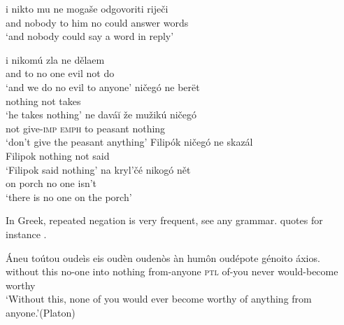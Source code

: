 \ea  \label{ex:07-serbian-answer}
\gll i nikto mu ne mogaše odgovoriti riječi \\
and nobody {to him} no could answer words \\
\glt `and nobody could say a word in reply'
\z %

\ea \label{ex:07-28}
\ea
\gll i nikomú zla ne dělaem\\
 and {to no one} evil not do\\
\glt `and we do no evil to anyone'
\ex 
\gll ničegó ne berët\\
 nothing not takes\\
\glt `he takes nothing'
\ex 
\gll ne daváĭ že mužikú ničegó\\
 not give-\textsc{imp} \textsc{emph} {to peasant} nothing\\
\glt `don't give the peasant anything'
\ex 
\gll Filipók ničegó ne skazál\\
 Filipok nothing not said\\
\glt `Filipok said nothing'
\ex {}
\gll na kryl’čé nikogó nět\\
 on porch {no one} isn't\\
\glt `there is no one on the porch'
\z
\z

In Greek, repeated negation is very frequent, see any grammar. \citet[\href{https://archive.org/details/syntaxofgreeklan00madvuoft/page/198/mode/2up?q="Avev+\%CF\%84\%CE\%BF\%CF\%8D\%CF\%84\%CE\%BF\%CF\%85+\%CE\%BF\%E1\%BD\%90\%CE\%B4\%CE\%B5\%E1\%BD\%B6\%CF\%82+\%CE\%B5\%E1\%BC\%B0\%CF\%82+\%CE\%BF\%E1\%BD\%90\%CE\%B4\%E1\%BD\%B2\%CE\%BD+\%CE\%BF\%E1\%BD\%90\%CE\%B4\%CE\%B5\%CE\%BD\%E1\%BD\%B8\%CF\%82+\%E1\%BC\%82\%CE\%BD+\%E1\%BD\%91\%CE\%BC\%E1\%BF\%B6\%CE\%BD+\%CE\%BF\%E1\%BD\%90\%CE\%B4\%CE\%AD\%CF\%80\%CE\%BF\%CF\%84\%CE\%B5+\%CE\%B3\%CE\%AD\%CE\%BD\%CE\%BF\%CE\%B9\%CF\%84\%CE\%BF+\%E1\%BC\%84\%CE\%BE\%CE\%B9\%CE\%BF\%CF\%82"}{§209}]{madvig1873syntax} quotes for instance .

\ea \label{ex:07-33}
\gll Áneu toútou oudeìs eis oudèn oudenòs àn humôn oudépote génoito áxios.\\
 without this no-one into nothing from-anyone \textsc{ptl} of-you never would-become worthy\\
\glt `Without this, none of you would ever become worthy of anything from anyone.'\hfill(Platon) %
\z

